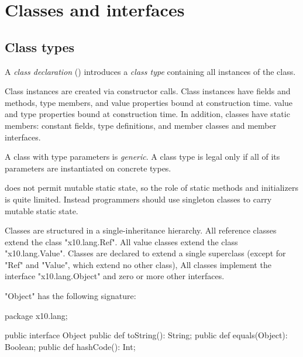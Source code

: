 \section{Classes and interfaces}
\label{ReferenceTypes}

\subsection{Class types}


        A {\em class declaration} ()
        introduces a 
        {\em class type}
        containing all instances of the class.

        Class instances are created via
        constructor calls.  Class instances have fields and
        methods, type members, and
\iftypeparams
        value properties bound at construction time.
\else
        value and type properties bound at construction time.
\fi
        In addition, classes have static
        members: constant fields, type definitions, and member
        classes and member interfaces.

\iftypeparams
        A class with type parameters is {\em generic}.  A class
        type is legal only if all of its parameters are instantiated
        on concrete types.
\fi

\Xten{} does
not
permit mutable static state, so the role of static methods and
initializers is quite limited. Instead programmers should use
singleton classes to carry mutable static state.


        Classes
        are structured in a
        single-inheritance hierarchy.  All reference classes
        extend the class \xcd"x10.lang.Ref".
        All value classes extend the class \xcd"x10.lang.Value".
        Classes are declared to extend a single
        superclass (except for \xcd"Ref" and \xcd"Value", which extend
        no other class),
        All classes implement the
        interface \xcd"x10.lang.Object"
        and zero or more other interfaces.

\xcd"Object" has the following signature:

\begin{xten}
package x10.lang;

public interface Object {
    public def toString(): String;
    public def equals(Object): Boolean;
    public def hashCode(): Int;
}
\end{xten}


